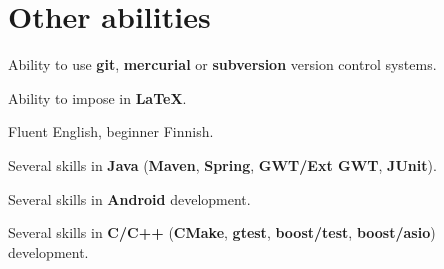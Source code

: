 \documentclass{cv}
\begin{document}
\section* {Other abilities}
\begin {list}{\textbullet}{\itemsep=0mm}
  \item Ability to use \textbf{git}, \textbf{mercurial} or \textbf{subversion}
    version control systems.
  \item Ability to impose in \textbf{LaTeX}.
  \item Fluent English, beginner Finnish.
  \item Several skills in \textbf{Java} (\textbf{Maven}, \textbf{Spring},
    \textbf{GWT/Ext GWT}, \textbf{JUnit}).
  \item Several skills in \textbf{Android} development.
  \item Several skills in \textbf{C/C++} (\textbf{CMake}, \textbf{gtest},
    \textbf{boost/test}, \textbf{boost/asio}) development.
\end {list}
\end{document}
